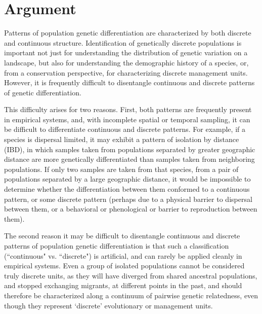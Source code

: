 \documentclass[12pt]{article}
\begin{document}


\newpage
\section*{Argument}
Patterns of population genetic differentiation are characterized by both discrete and 
continuous structure.  Identification of genetically discrete populations is important 
not just for understanding the distribution of genetic variation on a landscape, but also 
for understanding the demographic history of a species, or, from a conservation perspective, 
for characterizing discrete management units.  However, it is frequently difficult to disentangle 
continuous and discrete patterns of genetic differentiation.  

This difficulty arises for two reasons. First, both patterns are frequently present in empirical 
systems, and, with incomplete spatial or temporal sampling, it can be difficult to differentiate 
continuous and discrete patterns.  For example, if a species is dispersal limited, it may exhibit 
a pattern of isolation by distance (IBD), in which samples taken from populations separated 
by greater geographic distance are more genetically differentiated than samples taken from 
neighboring populations.  If only two samples are taken from that species, from a pair of 
populations separated by a large geographic distance, it would be impossible to determine 
whether the differentiation between them conformed to a continuous pattern, or some discrete 
pattern (perhaps due to a physical barrier to dispersal between them, or a behavioral or 
phenological or  barrier to reproduction between them).

The second reason it may be difficult to disentangle continuous and discrete patterns of 
population genetic differentiation is that such a classification (``continuous" vs. ``discrete") 
is artificial, and can rarely be applied cleanly in empirical systems.  Even a group of isolated  
populations cannot be considered truly discrete units, as they will have diverged from 
shared ancestral populations, and stopped exchanging migrants, at different points in 
the past, and should therefore be characterized along a continuum of pairwise genetic relatedness,
even though they represent `discrete' evolutionary or management units.
\end{document}
